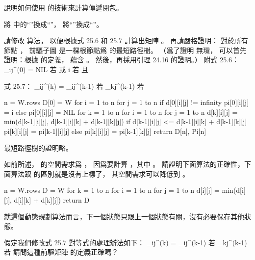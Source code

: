 \startEXERCISE
說明如何使用 的技術來計算傳遞閉包。
\stopEXERCISE

\startANSWER
將  中的“\m{\min}”換成“\m{\lor}”，
將“\m{+}”換成“\m{\land}”。
\stopANSWER

\startEXERCISE
請修改  算法，
以便根據式 25.6 和 25.7 計算出矩陣 。
再請嚴格證明：
對於所有節點 ，
前驅子圖  是一棵根節點爲  的最短路徑樹。
（\hint 爲了證明  無環，
可以首先證明：根據  的定義，
  蘊含 。
然後，再採用引理 24.16 的證明。）
附式 25.6：
\startformula
\pi_{ij}^{(0)} = \startcases
\NC NIL \NC 若  或  \NR
\NC i   \NC 若  且  \NR
\stopcases
\stopformula

式 25.7：
\startformula
\pi_{ij}^{(k)} = \startcases
\NC \pi_{ij}^{(k-1)} \NC 若  \NR
\NC \pi_{kj}^{(k-1)} \NC 若  \NR
\stopcases
\stopformula
\stopEXERCISE

\startANSWER
{}
\startCLRS
n = W.rows
D[0] = W
for i = 1 to n
	for j = 1 to n
		if d[0][i][j] != infinity
			pi[0][i][j] = i
		else
			pi[0][i][j] = NIL
for k = 1 to n
	for i = 1 to n
		for j = 1 to n
			d[k][i][j] = min(d[k-1][i][j], d[k-1][i][k] + d[k-1][k][j])
			if d[k-1][i][j] <= d[k-1][i][k] + d[k-1][k][j]
				pi[k][i][j] = pi[k-1][i][j]
			else
				pi[k][i][j] = pi[k-1][k][j]
return D[n], Pi[n]
\stopCLRS

最短路徑樹的證明略。
\stopANSWER

\startEXERCISE
如前所述，  的空間需求爲 ，
因爲要計算 ，其中 。
請證明下面算法的正確性，下面算法跟  的區別就是沒有上標了，
其空間需求可以降低到 。

\startCLRS
n = W.rows
D = W
for k = 1 to n
	for i = 1 to n
		for j = 1 to n
			d[i][j] = min(d[i][j], d[i][k] + d[k][j])
return D
\stopCLRS
\stopEXERCISE

\startANSWER
就這個動態規劃算法而言，下一個狀態只跟上一個狀態有關，沒有必要保存其他狀態。
\stopANSWER

\startEXERCISE
假定我們修改式 25.7 對等式的處理辦法如下：
\startformula
\pi_{ij}^{(k)} = \startcases
\NC \pi_{ij}^{(k-1)} \NC 若  \NR
\NC \pi_{kj}^{(k-1)} \NC 若  \NR
\stopcases
\stopformula
請問這種前驅矩陣 \m{\prod} 的定義正確嗎？
\stopEXERCISE


